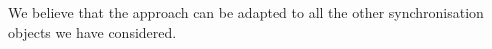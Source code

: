 


We believe that the approach can be adapted to all the other synchronisation
objects we have considered.
